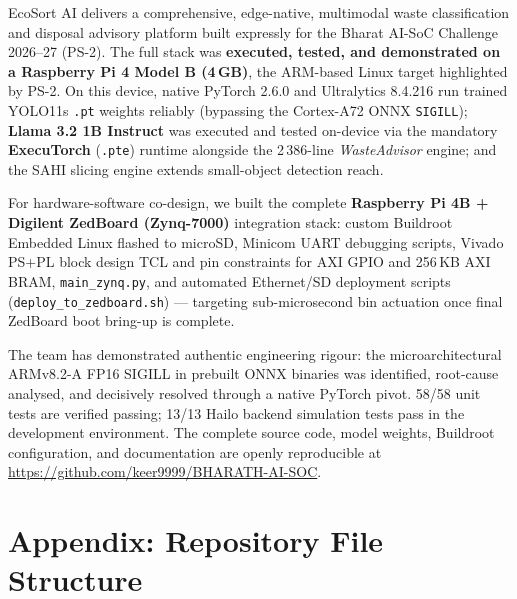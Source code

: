 \documentclass[12pt,a4paper]{article}
\begin{document}
EcoSort AI delivers a comprehensive, edge-native, multimodal waste classification and
disposal advisory platform built expressly for the Bharat AI-SoC Challenge 2026--27
(PS-2). The full stack was \textbf{executed, tested, and demonstrated on a Raspberry Pi 4
Model B (4\,GB)}, the ARM-based Linux target highlighted by PS-2. On this device, native
PyTorch 2.6.0 and Ultralytics 8.4.216 run trained YOLO11s \texttt{.pt} weights reliably
(bypassing the Cortex-A72 ONNX \texttt{SIGILL}); \textbf{Llama 3.2 1B Instruct} was executed
and tested on-device via the mandatory \textbf{ExecuTorch} (\texttt{.pte}) runtime alongside
the 2\,386-line \textit{WasteAdvisor} engine; and the SAHI slicing engine extends small-object
detection reach.

For hardware-software co-design, we built the complete \textbf{Raspberry Pi 4B + Digilent
ZedBoard (Zynq-7000)} integration stack: custom Buildroot Embedded Linux flashed to microSD,
Minicom UART debugging scripts, Vivado PS+PL block design TCL and pin constraints for
AXI GPIO and 256\,KB AXI BRAM, \texttt{main\_zynq.py}, and automated Ethernet/SD deployment
scripts (\texttt{deploy\_to\_zedboard.sh}) --- targeting sub-microsecond bin actuation once
final ZedBoard boot bring-up is complete.

The team has demonstrated authentic engineering rigour: the microarchitectural
ARMv8.2-A FP16 SIGILL in prebuilt ONNX binaries was identified, root-cause analysed,
and decisively resolved through a native PyTorch pivot. 58/58 unit tests are verified passing; 13/13 Hailo backend simulation tests pass in the development environment.
The complete source code, model weights, Buildroot configuration, and documentation
are openly reproducible at \url{https://github.com/keer9999/BHARATH-AI-SOC}.

\clearpage

\section*{Appendix: Repository File Structure}
\end{document}
